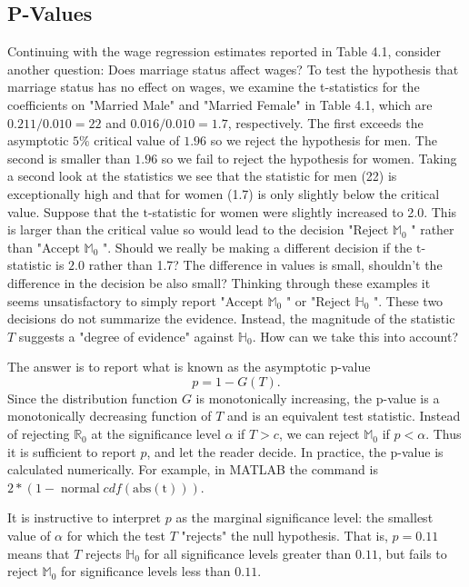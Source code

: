 \documentclass[10pt]{article}
\begin{document}
\subsection{P-Values}
Continuing with the wage regression estimates reported in Table 4.1, consider another question: Does marriage status affect wages? To test the hypothesis that marriage status has no effect on wages, we examine the t-statistics for the coefficients on "Married Male" and "Married Female" in Table 4.1, which are $0.211 / 0.010=22$ and $0.016 / 0.010=1.7$, respectively. The first exceeds the asymptotic $5 \%$ critical value of $1.96$ so we reject the hypothesis for men. The second is smaller than $1.96$ so we fail to reject the hypothesis for women. Taking a second look at the statistics we see that the statistic for men (22) is exceptionally high and that for women (1.7) is only slightly below the critical value. Suppose that the $\mathrm{t}$-statistic for women were slightly increased to 2.0. This is larger than the critical value so would lead to the decision "Reject $\mathbb{M}_{0}$ " rather than "Accept $\mathbb{M}_{0}$ ". Should we really be making a different decision if the $\mathrm{t}$-statistic is $2.0$ rather than 1.7? The difference in values is small, shouldn't the difference in the decision be also small? Thinking through these examples it seems unsatisfactory to simply report "Accept $\mathbb{M}_{0}$ " or "Reject $\mathbb{H}_{0}$ ". These two decisions do not summarize the evidence. Instead, the magnitude of the statistic $T$ suggests a "degree of evidence" against $\mathbb{H}_{0}$. How can we take this into account?

The answer is to report what is known as the asymptotic p-value
$$
p=1-G(T) .
$$
Since the distribution function $G$ is monotonically increasing, the p-value is a monotonically decreasing function of $T$ and is an equivalent test statistic. Instead of rejecting $\mathbb{R}_{0}$ at the significance level $\alpha$ if $T>c$, we can reject $\mathbb{M}_{0}$ if $p<\alpha$. Thus it is sufficient to report $p$, and let the reader decide. In practice, the p-value is calculated numerically. For example, in MATLAB the command is $2 *(1-\operatorname{normal} c d f(\mathrm{abs}(\mathrm{t})))$.

It is instructive to interpret $p$ as the marginal significance level: the smallest value of $\alpha$ for which the test $T$ "rejects" the null hypothesis. That is, $p=0.11$ means that $T$ rejects $\mathbb{H}_{0}$ for all significance levels greater than $0.11$, but fails to reject $\mathbb{M}_{0}$ for significance levels less than $0.11$.
\end{document}
